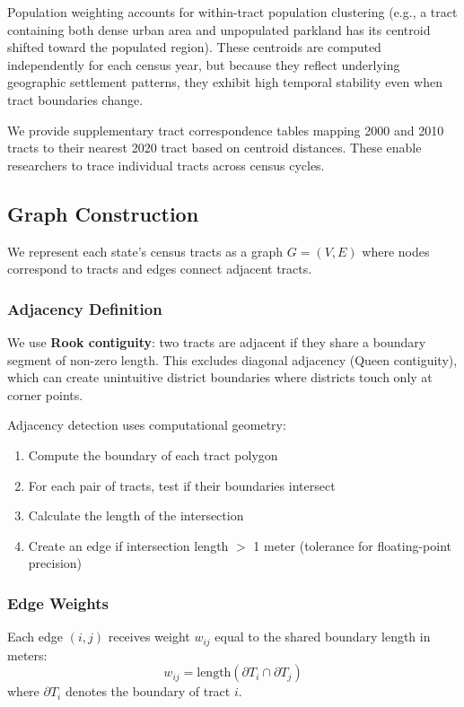 Population weighting accounts for within-tract population clustering (e.g., a tract containing both dense urban area and unpopulated parkland has its centroid shifted toward the populated region). These centroids are computed independently for each census year, but because they reflect underlying geographic settlement patterns, they exhibit high temporal stability even when tract boundaries change.

We provide supplementary tract correspondence tables mapping 2000 and 2010 tracts to their nearest 2020 tract based on centroid distances. These enable researchers to trace individual tracts across census cycles.

\subsection{Graph Construction}
\label{sec:graph-construction}

We represent each state's census tracts as a graph $G = (V, E)$ where nodes correspond to tracts and edges connect adjacent tracts.

\subsubsection{Adjacency Definition}

We use \textbf{Rook contiguity}: two tracts are adjacent if they share a boundary segment of non-zero length. This excludes diagonal adjacency (Queen contiguity), which can create unintuitive district boundaries where districts touch only at corner points.

Adjacency detection uses computational geometry:
\begin{enumerate}
    \item Compute the boundary of each tract polygon
    \item For each pair of tracts, test if their boundaries intersect
    \item Calculate the length of the intersection
    \item Create an edge if intersection length $>$ 1 meter (tolerance for floating-point precision)
\end{enumerate}

\subsubsection{Edge Weights}

Each edge $(i,j)$ receives weight $w_{ij}$ equal to the shared boundary length in meters:
\[
w_{ij} = \text{length}(\partial T_i \cap \partial T_j)
\]
where $\partial T_i$ denotes the boundary of tract $i$.

